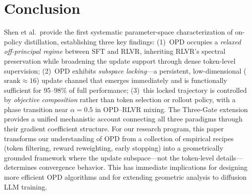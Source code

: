 \documentclass[11pt,a4paper]{article}
\begin{document}
\section{Conclusion}

Shen et al.\ provide the first systematic parameter-space characterization of on-policy distillation, establishing three key findings: (1)~OPD occupies a \emph{relaxed off-principal regime} between SFT and RLVR, inheriting RLVR's spectral preservation while broadening the update support through dense token-level supervision; (2)~OPD exhibits \emph{subspace locking}---a persistent, low-dimensional ($\mathrm{srank}\!\approx\!16$) update channel that emerges immediately and is functionally sufficient for 95--98\% of full performance; (3)~this locked trajectory is controlled by \emph{objective composition} rather than token selection or rollout policy, with a phase transition near $\alpha\!=\!0.5$ in OPD--RLVR mixing. The Three-Gate extension provides a unified mechanistic account connecting all three paradigms through their gradient coefficient structure. For our research program, this paper transforms our understanding of OPD from a collection of empirical recipes (token filtering, reward reweighting, early stopping) into a geometrically grounded framework where the update subspace---not the token-level details---determines convergence behavior. This has immediate implications for designing more efficient OPD algorithms and for extending geometric analysis to diffusion LLM training.
\end{document}
